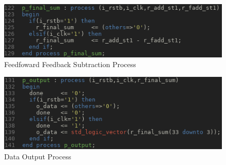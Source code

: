 \documentclass[12pt,a4paper,titlepage]{article}
\begin{document}
\begin{figure}[!htb]
  \centering
  \includegraphics[width=\textwidth]
                  {../presentation/final-add.png}
                  \caption{Feedfoward Feedback Subtraction Process}
                  \label{fig:a4}
\end{figure}
\begin{figure}[!htb]
  \centering
  \includegraphics[width=\textwidth]
                  {../presentation/output.png}
                  \caption{Data Output Process}
                  \label{fig:a5}
\end{figure}

\newpage
\end{document}
